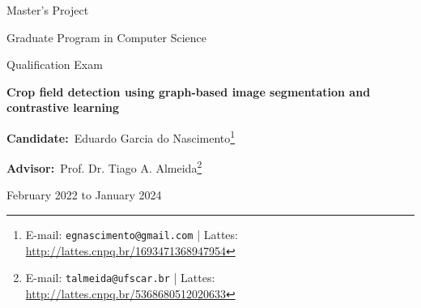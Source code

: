 \documentclass[12pt]{article}
\newcommand\vi{\vspace{\baselineskip}}
\begin{document}
	\thispagestyle{empty}
	\singlespacing

    \indent

	\vfill
	\vi
	\vi
	\vi

	\begin{center}
		\Large Master's Project

		\Large Graduate Program in Computer Science

		\vfill

		\Large Qualification Exam\\

	\end{center}

	\vi

	\begin{center}
	    \LARGE\bf Crop field detection using graph-based image segmentation and contrastive learning
	\end{center}

	\vfill

	\begin{center}
		{\bf Candidate:}~Eduardo Garcia do Nascimento\footnote{E-mail: \texttt{egnascimento@gmail.com} | Lattes: \url{http://lattes.cnpq.br/1693471368947954}}

		{\bf Advisor:}~Prof. Dr. Tiago A. Almeida\footnote{E-mail:
		\texttt{talmeida@ufscar.br} | Lattes: \url{http://lattes.cnpq.br/5368680512020633}}
	\end{center}

	\vfill
	\vfill

	\begin{center}
		February 2022 to January 2024
	\end{center}

	\vfill
\end{document}
